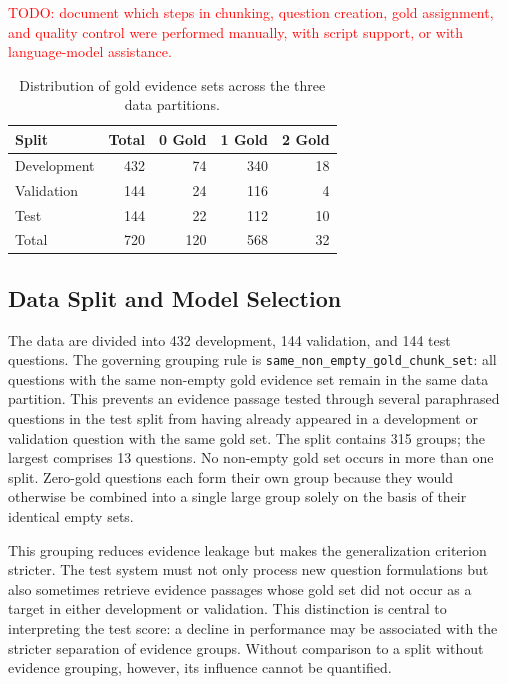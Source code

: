 \documentclass[11pt]{article}
\begin{document}
\textcolor{red}{TODO: document which steps in chunking, question creation, gold assignment, and quality control were performed manually, with script support, or with language-model assistance.}

\begin{table}[t]
\centering
\small
\begin{tabular}{lrrrr}
\toprule
\textbf{Split} & \textbf{Total} & \textbf{0 Gold} & \textbf{1 Gold} & \textbf{2 Gold} \\
\midrule
Development & 432 & 74 & 340 & 18 \\
Validation & 144 & 24 & 116 & 4 \\
Test         & 144 & 22 & 112 & 10 \\
\midrule
Total       & 720 & 120 & 568 & 32 \\
\bottomrule
\end{tabular}
\caption{Distribution of gold evidence sets across the three data partitions.}
\label{tab:gold-distribution}
\end{table}

\subsection{Data Split and Model Selection}

The data are divided into 432 development, 144 validation, and 144 test questions. The governing grouping rule is \texttt{same\_non\_empty\_gold\_chunk\_set}: all questions with the same non-empty gold evidence set remain in the same data partition. This prevents an evidence passage tested through several paraphrased questions in the test split from having already appeared in a development or validation question with the same gold set. The split contains 315 groups; the largest comprises 13 questions. No non-empty gold set occurs in more than one split. Zero-gold questions each form their own group because they would otherwise be combined into a single large group solely on the basis of their identical empty sets.

This grouping reduces evidence leakage but makes the generalization criterion stricter. The test system must not only process new question formulations but also sometimes retrieve evidence passages whose gold set did not occur as a target in either development or validation. This distinction is central to interpreting the test score: a decline in performance may be associated with the stricter separation of evidence groups. Without comparison to a split without evidence grouping, however, its influence cannot be quantified.
\end{document}

